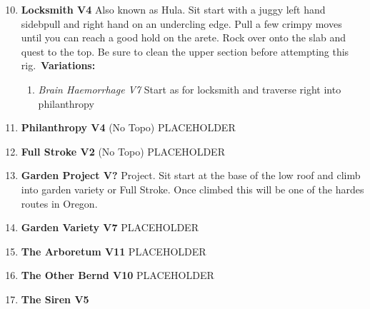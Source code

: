 \begin{enumerate}[]
	\setcounter{enumi}{9}
	\item\label{rt:Locksmith} \colorbox{RoyalBlue!20}{\textbf{Locksmith V4     \warn \warn } }
	\newline Also known as Hula. Sit start with a juggy left hand sidebpull and right hand on an undercling edge. Pull a few crimpy moves until you can reach a good hold on the arete. Rock over onto the slab and quest to the top. Be sure to clean the upper section before attempting this rig.\
	\newline \textbf{Variations:}
	\begin{enumerate}
		\item\label{vr:Brain Haemorrhage} \colorbox{Goldenrod!50}{\emph{Brain Haemorrhage V7  }  }
		\newline Start as for locksmith and traverse right into philanthropy\
	\end{enumerate}
	\setcounter{enumi}{10}
	\item\label{rt:Philanthropy} \colorbox{RoyalBlue!20}{\textbf{Philanthropy V4  } }
	\newline (No Topo) 
	\newline PLACEHOLDER\
	\setcounter{enumi}{11}
	\item\label{rt:Full Stroke} \colorbox{green!20}{\textbf{Full Stroke V2  } }
	\newline (No Topo) 
	\newline PLACEHOLDER\
	\setcounter{enumi}{12}
	\item\label{rt:Garden Project} \colorbox{black!20}{\textbf{Garden Project V?  } }
	\newline Project. Sit start at the base of the low roof and climb into garden variety or Full Stroke. Once climbed this will be one of the hardes routes in Oregon.\
	\setcounter{enumi}{13}
	\item\label{rt:Garden Variety} \colorbox{Goldenrod!50}{\textbf{Garden Variety V7  } }
	\newline PLACEHOLDER\
	\setcounter{enumi}{14}
	\item\label{rt:The Arboretum} \colorbox{red!20}{\textbf{The Arboretum V11  } }
	\newline PLACEHOLDER\
	\setcounter{enumi}{15}
	\item\label{rt:The Other Bernd} \colorbox{red!20}{\textbf{The Other Bernd V10  } }
	\newline PLACEHOLDER\
	\setcounter{enumi}{16}
	\item\label{rt:The Siren} \colorbox{RoyalBlue!20}{\textbf{The Siren V5     } }

\end{enumerate}
